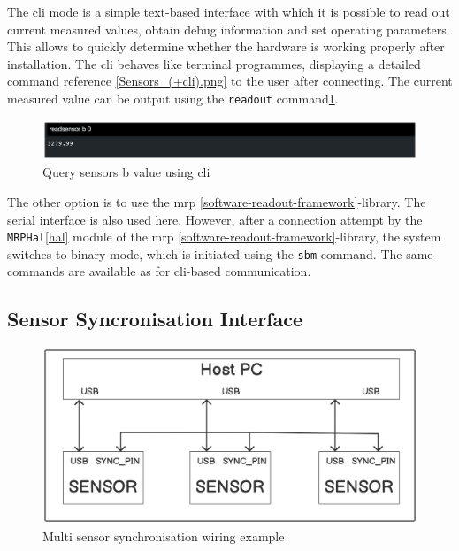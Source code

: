 The \gls{cli} mode is a simple text-based interface with which it is
possible to read out current measured values, obtain debug information
and set operating parameters. This allows to quickly determine whether
the hardware is working properly after installation. The \gls{cli}
behaves like terminal programmes, displaying a detailed command
reference \ref{Sensors_(+cli).png} to the user after connecting. The
current measured value can be output using the
\passthrough{\lstinline!readout!}
command\ref{Query_sensors_b_value_using_(+cli).png}.

\begin{figure}
\centering
\includegraphics{./generated_images/border_Query_sensors_b_value_using_(+cli).png}
\caption{Query sensors b value using \gls{cli}
\label{Query_sensors_b_value_using_(+cli).png}}
\end{figure}

The other option is to use the \gls{mrp}
\ref{software-readout-framework}-library. The serial interface is also
used here. However, after a connection attempt by the
\passthrough{\lstinline!MRPHal!}\ref{hal} module of the \gls{mrp}
\ref{software-readout-framework}-library, the system switches to binary
mode, which is initiated using the \passthrough{\lstinline!sbm!}
command. The same commands are available as for \gls{cli}-based
communication.

\hypertarget{sensor-syncronisation-interface}{%
\subsection{Sensor Syncronisation
Interface}\label{sensor-syncronisation-interface}}

\begin{figure}
\centering
\includegraphics{./generated_images/border_Multi_sensor_synchronisation_wiring_example.png}
\caption{Multi sensor synchronisation wiring example
\label{Multi_sensor_synchronisation_wiring_example.png}}
\end{figure}


